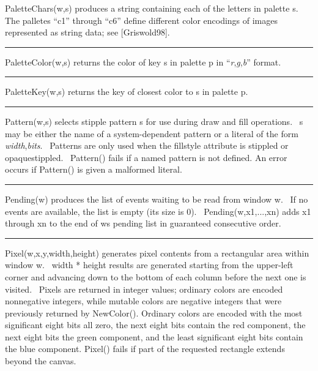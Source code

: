 \noindent
\textsf{PaletteChars(w,s)} produces a string containing each of the
letters in palette \textsf{s}. The palletes
{\textquotedblleft}c1{\textquotedblright} through
{\textquotedblleft}c6{\textquotedblright} define different color
encodings of images represented as string data; see [Griswold98].

\bigskip\hrule\vspace{0.1cm}

\noindent
\textsf{PaletteColor(w,s)} returns the color of key \textsf{s} in
palette \textsf{p} in
\textsf{{\textquotedblleft}}\textsf{\textit{r}}\textsf{,}\textsf{\textit{g}}\textsf{,}\textsf{\textit{b}}\textsf{{\textquotedblright}}
format.

\bigskip\hrule\vspace{0.1cm}

\noindent
\textsf{PaletteKey(w,s)} returns the key of closest color to \textsf{s}
in palette \textsf{p}.

\bigskip\hrule\vspace{0.1cm}

\noindent
\textsf{Pattern(w,s)} selects stipple pattern \textsf{s} for use during
draw and fill operations. \ \textsf{s} may be either the name of a
system-dependent pattern or a literal of the form
\textit{width},\textit{bits}. \ Patterns are only used when the
\textsf{fillstyle} attribute is \textsf{stippled} or
\textsf{opaquestippled}. \ \textsf{Pattern()} fails if a named pattern
is not defined. An error occurs if \textsf{Pattern()} is given a
malformed literal.

\bigskip\hrule\vspace{0.1cm}

\noindent
\textsf{Pending(w)} produces the list of events waiting to be read from
window \textsf{w}. \ If no events are available, the list is empty (its
size is 0). \ \textsf{Pending(w,x1,...,xn)} adds \textsf{x1} through
\textsf{xn} to the end of \textsf{w}{\textquotesingle}s pending list in
guaranteed consecutive order.

\bigskip\hrule\vspace{0.1cm}

\noindent
\textsf{Pixel(w,x,y,width,height)} generates pixel contents from a
rectangular area within window \textsf{w}. \ \textsf{width * height}
results are generated starting from the upper-left corner and advancing
down to the bottom of each column before the next one is visited.
\ Pixels are returned in integer values; ordinary colors are encoded
nonnegative integers, while mutable colors are negative integers that
were previously returned by \textsf{NewColor()}. Ordinary colors are
encoded with the most significant eight bits all zero, the next eight
bits contain the red component, the next eight bits the green
component, and the least significant eight bits contain the blue
component. \textsf{Pixel()} fails if part of the requested rectangle
extends beyond the canvas.

